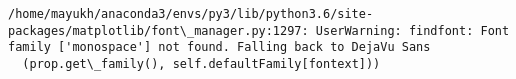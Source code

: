 \documentclass[11pt]{article}
\begin{document}
    \begin{Verbatim}[commandchars=\\\{\}]
/home/mayukh/anaconda3/envs/py3/lib/python3.6/site-packages/matplotlib/font\_manager.py:1297: UserWarning: findfont: Font family ['monospace'] not found. Falling back to DejaVu Sans
  (prop.get\_family(), self.defaultFamily[fontext]))

    \end{Verbatim}

    \begin{center}
    \end{center}
    { \hspace*{\fill} \\}
    
    \begin{center}
    \end{center}
    { \hspace*{\fill} \\}
    
\end{document}
